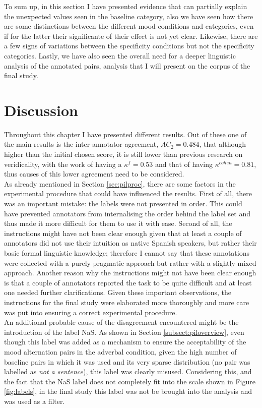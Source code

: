 To sum up, in this section I have presented evidence that can partially explain the unexpected values seen in the baseline category, also we have seen how there are some distinctions between the different mood conditions and categories, even if for the latter their significante of their effect is not yet clear. Likewise, there are a few signs of variations between the specificity conditions but not the specificity categories. Lastly, we have also seen the overall need for a deeper linguistic analysis of the annotated pairs, analysis that I will present on the corpus of the final study.\\

\section{Discussion}
\label{sect:pildisc}
Throughout this chapter I have presented different results. Out of these one of the main results is the inter-annotator agreement, $AC_2=0.484$, that although higher than the initial chosen score, it is still lower than previous research on veridicality, with the work of \citet{de2012did} having a $\kappa^f=0.53$ and that of \citet{sauri2009factbank} having $\kappa^{cohen} = 0.81$, thus causes of this lower agreement need to be considered.\\

As already mentioned in Section \ref{sec:pilproc}, there are some factors in the experimental procedure that could have influenced the results. First of all, there was an important mistake: the labels were not presented in order. This could have prevented annotators from internalising the order behind the label set and thus made it more difficult for them to use it with ease. Second of all, the instructions might have not been clear enough given that at least a couple of annotators did not use their intuition as native Spanish speakers, but rather their basic formal linguistic knowledge; therefore I cannot say that these annotations were collected with a purely pragmatic approach but rather with a slightly mixed approach. Another reason why the instructions might not have been clear enough is that a couple of annotators reported the task to be quite difficult and at least one needed further clarifications. Given these important observations, the instructions for the final study were elaborated more thoroughly and more care was put into ensuring a correct experimental procedure.\\

An additional probable cause of the disagreement encountered might be the introduction of the label NaS. As shown in Section \ref{subsect:piloverview}, even though this label was added as a mechanism to ensure the acceptability of the mood alternation pairs in the adverbal condition, given the high number of baseline pairs in which it was used and its very sparse distribution (no pair was labelled as \textit{not a sentence}), this label was clearly misused. Considering this, and the fact that the NaS label does not completely fit into the scale shown in Figure \ref{fig:labels}, in the final study this label was not be brought into the analysis and was used as a filter.\\   

